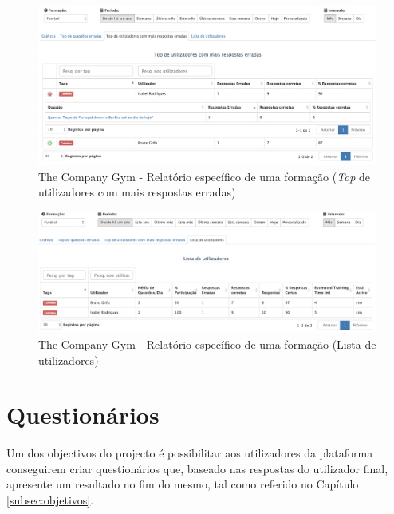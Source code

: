 \begin{figure}[ht!]
	\begin{center}
		\includegraphics[width=1\textwidth]{img/tcg/tcg-data-f2.png}
		\caption{The Company Gym - Relatório específico de uma formação (\textit{Top} de utilizadores com mais respostas erradas)}
		\label{fig:tcg-data-f2}
	\end{center}
\end{figure}

\begin{figure}[ht!]
	\begin{center}
		\includegraphics[width=1\textwidth]{img/tcg/tcg-data-f3.png}
		\caption{The Company Gym - Relatório específico de uma formação (Lista de utilizadores)}
		\label{fig:tcg-data-f3}
	\end{center}
\end{figure}

\newpage


\section{Questionários}

Um dos objectivos do projecto é possibilitar aos utilizadores da plataforma conseguirem criar questionários que, baseado nas respostas do utilizador final, apresente um resultado no fim do mesmo, tal como referido no Capítulo \ref{subsec:objetivos}.

